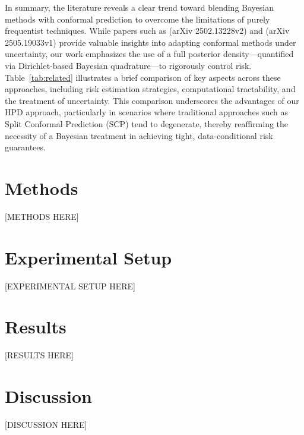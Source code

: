 \documentclass{article}
\begin{document}
In summary, the literature reveals a clear trend toward blending Bayesian methods with conformal prediction to overcome the limitations of purely frequentist techniques. While papers such as (arXiv 2502.13228v2) and (arXiv 2505.19033v1) provide valuable insights into adapting conformal methods under uncertainty, our work emphasizes the use of a full posterior density—quantified via Dirichlet-based Bayesian quadrature—to rigorously control risk. Table~\ref{tab:related} illustrates a brief comparison of key aspects across these approaches, including risk estimation strategies, computational tractability, and the treatment of uncertainty. This comparison underscores the advantages of our HPD approach, particularly in scenarios where traditional approaches such as Split Conformal Prediction (SCP) tend to degenerate, thereby reaffirming the necessity of a Bayesian treatment in achieving tight, data-conditional risk guarantees.

\section{Methods}
[METHODS HERE]

\section{Experimental Setup}
[EXPERIMENTAL SETUP HERE]

\section{Results}
[RESULTS HERE]

\section{Discussion}
[DISCUSSION HERE]
\end{document}
